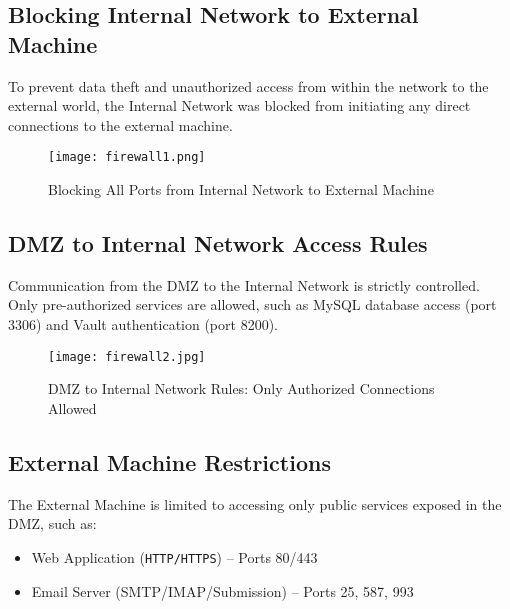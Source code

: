 \documentclass[12pt]{report}
\begin{document}
\subsection*{Blocking Internal Network to External Machine}

To prevent data theft and unauthorized access from within the network to the external world, the Internal Network was blocked from initiating any direct connections to the external machine.

\begin{figure}[h]
    \centering
    \texttt{[image: firewall1.png]}
    \caption{Blocking All Ports from Internal Network to External Machine}
    \label{fig:firewall-internal-block}
\end{figure}

\subsection*{DMZ to Internal Network Access Rules}

Communication from the DMZ to the Internal Network is strictly controlled. Only pre-authorized services are allowed, such as MySQL database access (port 3306) and Vault authentication (port 8200).

\begin{figure}[h]
    \centering
    \texttt{[image: firewall2.jpg]}
    \caption{DMZ to Internal Network Rules: Only Authorized Connections Allowed}
    \label{fig:firewall-dmz-to-internal}
\end{figure}

\subsection*{External Machine Restrictions}

The External Machine is limited to accessing only public services exposed in the DMZ, such as:

\begin{itemize}
    \item Web Application (\texttt{HTTP/HTTPS}) – Ports 80/443
    \item Email Server (SMTP/IMAP/Submission) – Ports 25, 587, 993
\end{itemize}
\end{document}
